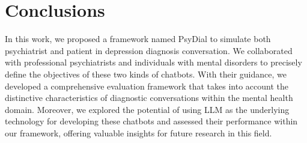 \section{Conclusions}
\label{sec:conclusion}

In this work, we proposed a framework named PsyDial to simulate both psychiatrist and patient in depression diagnosis conversation. We collaborated with professional psychiatrists and individuals with mental disorders to precisely define the objectives of these two kinds of chatbots. With their guidance, we developed a comprehensive evaluation framework that takes into account the distinctive characteristics of diagnostic conversations within the mental health domain. Moreover, we explored the potential of using LLM as the underlying technology for developing these chatbots and assessed their performance within our framework, offering valuable insights for future research in this field.

